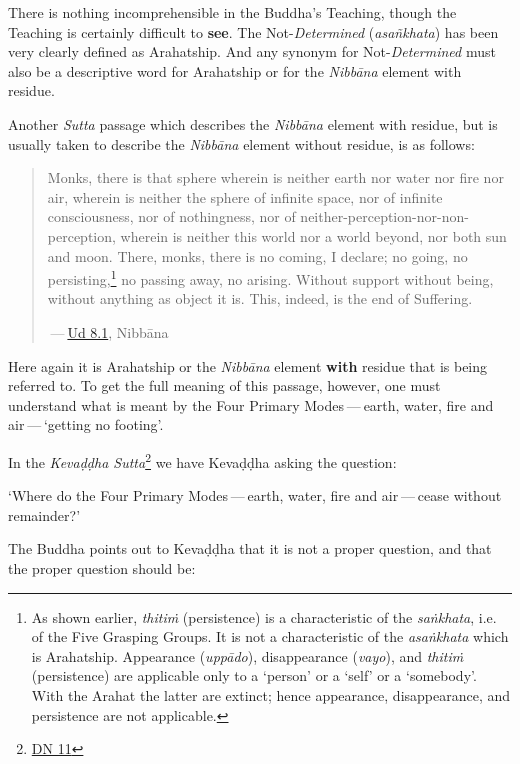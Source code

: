 There is nothing incomprehensible in the Buddha's Teaching, though the Teaching is certainly difficult to \textbf{see}. The Not-\emph{Determined} (\emph{asañkhata}) has been very clearly defined as Arahatship. And any synonym for Not-\emph{Determined} must also be a descriptive word for Arahatship or for the \emph{Nibbāna} element with residue.

Another \emph{Sutta} passage which describes the \emph{Nibbāna} element with residue, but is usually taken to describe the \emph{Nibbāna} element without residue, is as follows:

\begin{quote}
Monks, there is that sphere wherein is neither earth nor water nor fire nor air, wherein is neither the sphere of infinite space, nor of infinite consciousness, nor of nothingness, nor of neither-perception-nor-non-perception, wherein is neither this world nor a world beyond, nor both sun and moon. There, monks, there is no coming, I declare; no going, no persisting,\footnote{As shown earlier, \emph{thitiṁ} (persistence) is a characteristic of the \emph{saṅkhata}, i.e. of the Five Grasping Groups. It is not a characteristic of the \emph{asaṅkhata} which is Arahatship. Appearance (\emph{uppādo}), disappearance (\emph{vayo}), and \emph{thitiṁ} (persistence) are applicable only to a `person' or a `self' or a `somebody'. With the Arahat the latter are extinct; hence appearance, disappearance, and persistence are not applicable.} no passing away, no arising. Without support without being, without anything as object it is. This, indeed, is the end of Suffering.

 --- \href{https://suttacentral.net/ud8.1/en/anandajoti}{Ud 8.1}, Nibbāna
\end{quote}

Here again it is Arahatship or the \emph{Nibbāna} element \textbf{with} residue that is being referred to. To get the full meaning of this passage, however, one must understand what is meant by the Four Primary Modes --- earth, water, fire and air --- `getting no footing'.

In the \emph{Kevaḍḍha Sutta}\footnote{\href{https://suttacentral.net/dn11/en/sujato}{DN 11}} we have Kevaḍḍha asking the question:

`Where do the Four Primary Modes --- earth, water, fire and air --- cease without remainder?'

The Buddha points out to Kevaḍḍha that it is not a proper question, and that the proper question should be:

